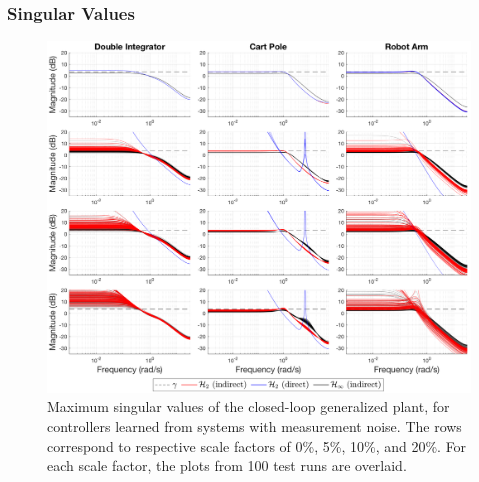 \subsubsection{Singular Values}
\begin{figure}[H]
\centering
	\includegraphics[width=\textwidth]{figures/noise_singular_values3.png}
\caption{Maximum singular values of the closed-loop generalized plant, for controllers learned from systems with measurement noise.  The rows correspond to respective scale factors of 0\%, 5\%, 10\%, and 20\%.  For each scale factor, the plots from 100 test runs are overlaid.}
\label{fig:noise_singular_values3}
\end{figure}

\newpage
